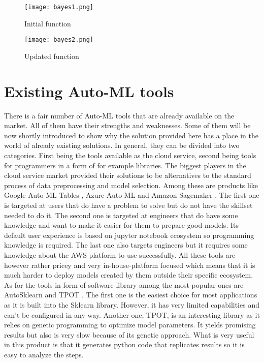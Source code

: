 \documentclass[a4paper,twoside,12pt]{book}
\newcommand*\setcaptioncitation[1]{\def\captioncitation{\textit{Source:}~#1}}
\let\captioncitation\relax
\begin{document}
\begin{figure}[!htb]
    \centering
    \texttt{[image: bayes1.png]}
    \setcaptioncitation{\url{https://cutt.ly/IjxGTcu}}
    \caption{Initial function}
    \label{fig:bayes1}
\end{figure}
\begin{figure}[!htb]
    \centering
    \texttt{[image: bayes2.png]}
    \setcaptioncitation{\url{https://cutt.ly/DjxGTS8}}
    \caption{Updated function}
    \label{fig:bayes2}
\end{figure}
\newpage
\section{Existing Auto-ML tools}

There is a fair number of Auto-ML tools that are already available on the market. All of them have their strengths and weaknesses. Some of them will be now shortly introduced to show why the solution provided here has a place in the world of already existing solutions.
In general, they can be divided into two categories. First being the tools available as the cloud service, second being tools for programmers in a form of for example libraries.
The biggest players in the cloud service market provided their solutions to be alternatives to the standard process of data preprocessing and model selection.
Among these are products like Google Auto-ML Tables \cite{bib:google}, Azure Auto-ML \cite{bib:azure} and Amazon Sagemaker \cite{bib:amazon}. The first one is targeted at users that do have a problem to solve but do not have the skillset needed to do it. The second one is targeted at engineers that do have some knowledge and want to make it easier for them to prepare good models. Its default user experience is based on jupyter notebook ecosystem so programming knowledge is required. The last one also targets engineers but it requires some knowledge about the AWS platform to use successfully. All these tools are however rather pricey and very in-house-platform focused which means that it is much harder to deploy models created by them outside their specific ecosystem.
As for the tools in form of software library among the most popular ones are AutoSklearn \cite{bib:autosklearn} and TPOT \cite{bib:TPOT}.
The first one is the easiest choice for most applications as it is built into the Sklearn library. However, it has very limited capabilities and can't be configured in any way. 
Another one, TPOT, is an interesting library as it relies on genetic programming to optimize model parameters. It yields promising results but also is very slow because of its genetic approach. What is very useful in this product is that it generates python code that replicates results so it is easy to analyze the steps. 
\end{document}
